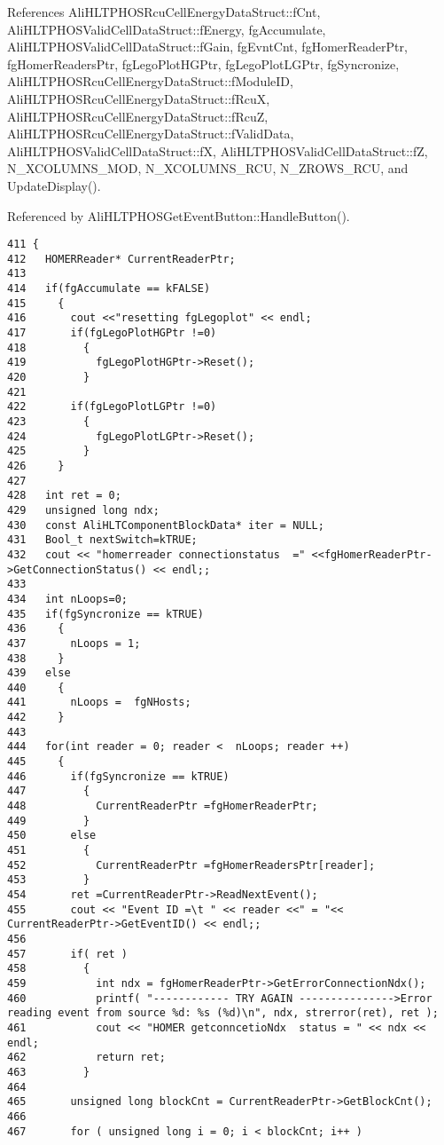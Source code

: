 References Ali\-HLTPHOSRcu\-Cell\-Energy\-Data\-Struct::f\-Cnt, Ali\-HLTPHOSValid\-Cell\-Data\-Struct::f\-Energy, fg\-Accumulate, Ali\-HLTPHOSValid\-Cell\-Data\-Struct::f\-Gain, fg\-Evnt\-Cnt, fg\-Homer\-Reader\-Ptr, fg\-Homer\-Readers\-Ptr, fg\-Lego\-Plot\-HGPtr, fg\-Lego\-Plot\-LGPtr, fg\-Syncronize, Ali\-HLTPHOSRcu\-Cell\-Energy\-Data\-Struct::f\-Module\-ID, Ali\-HLTPHOSRcu\-Cell\-Energy\-Data\-Struct::f\-Rcu\-X, Ali\-HLTPHOSRcu\-Cell\-Energy\-Data\-Struct::f\-Rcu\-Z, Ali\-HLTPHOSRcu\-Cell\-Energy\-Data\-Struct::f\-Valid\-Data, Ali\-HLTPHOSValid\-Cell\-Data\-Struct::f\-X, Ali\-HLTPHOSValid\-Cell\-Data\-Struct::f\-Z, N\_\-XCOLUMNS\_\-MOD, N\_\-XCOLUMNS\_\-RCU, N\_\-ZROWS\_\-RCU, and Update\-Display().

Referenced by Ali\-HLTPHOSGet\-Event\-Button::Handle\-Button().

\footnotesize\begin{verbatim}411 {
412   HOMERReader* CurrentReaderPtr;
413 
414   if(fgAccumulate == kFALSE)
415     {
416       cout <<"resetting fgLegoplot" << endl;
417       if(fgLegoPlotHGPtr !=0)
418         {
419           fgLegoPlotHGPtr->Reset(); 
420         }
421 
422       if(fgLegoPlotLGPtr !=0)
423         {
424           fgLegoPlotLGPtr->Reset();
425         }  
426     }
427 
428   int ret = 0;
429   unsigned long ndx;
430   const AliHLTComponentBlockData* iter = NULL;   
431   Bool_t nextSwitch=kTRUE; 
432   cout << "homerreader connectionstatus  =" <<fgHomerReaderPtr->GetConnectionStatus() << endl;;
433 
434   int nLoops=0;
435   if(fgSyncronize == kTRUE)
436     {
437       nLoops = 1;
438     }
439   else
440     {
441       nLoops =  fgNHosts; 
442     }
443   
444   for(int reader = 0; reader <  nLoops; reader ++)
445     {
446       if(fgSyncronize == kTRUE)
447         {
448           CurrentReaderPtr =fgHomerReaderPtr;
449         }
450       else
451         {
452           CurrentReaderPtr =fgHomerReadersPtr[reader];
453         }
454       ret =CurrentReaderPtr->ReadNextEvent();  
455       cout << "Event ID =\t " << reader <<" = "<< CurrentReaderPtr->GetEventID() << endl;;
456   
457       if( ret ) 
458         {
459           int ndx = fgHomerReaderPtr->GetErrorConnectionNdx();
460           printf( "------------ TRY AGAIN --------------->Error reading event from source %d: %s (%d)\n", ndx, strerror(ret), ret );
461           cout << "HOMER getconncetioNdx  status = " << ndx << endl;
462           return ret; 
463         }
464   
465       unsigned long blockCnt = CurrentReaderPtr->GetBlockCnt();
466       
467       for ( unsigned long i = 0; i < blockCnt; i++ ) 

\end{verbatim}
